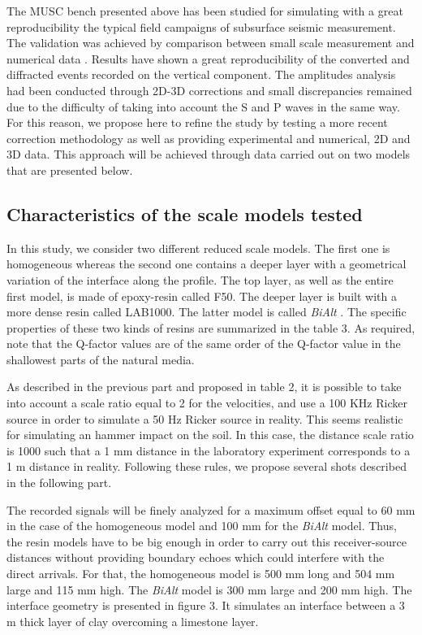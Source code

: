 \documentclass[manuscript,revised]{geophysics}
\newcommand{\bialt}{\textit{BiAlt} }
\begin{document}
\noindent The MUSC bench presented above has been studied for simulating with a great reproducibility the typical field campaigns of subsurface seismic measurement. The validation was achieved by comparison between small scale measurement and numerical data \citep{Bretaudeau_SSM_2011}. Results have shown a great reproducibility of the converted and diffracted events recorded on the vertical component. The amplitudes analysis had been conducted through 2D-3D corrections and small discrepancies remained due to the difficulty of taking into account the S and P waves in the same way. For this reason, we propose here to refine the study by testing a more recent correction methodology \citet{Schafer_LSS_2014} as well as providing experimental and numerical, 2D and 3D data. This approach will be achieved through data carried out on two models that are presented below.


\subsection{Characteristics of the scale models tested}

\noindent In this study, we consider two different reduced scale models. The first one is homogeneous whereas the second one contains a deeper layer with a geometrical variation of the interface along the profile. The top layer, as well as the entire first model, is made of epoxy-resin called F50. The deeper layer is built with a more dense resin called LAB1000. The latter model is called \bialt. The specific properties of these two kinds of resins are summarized in the table 3. As required, note that the Q-factor values are of the same order of the Q-factor value in the shallowest parts of the natural media.

\noindent As described in the previous part and proposed in table 2, it is possible to take into account a scale ratio equal to 2 for the velocities, and use a 100 KHz Ricker source in order to simulate a 50 Hz Ricker source in reality. This seems realistic for simulating an hammer impact on the soil. In this case, the distance scale ratio is 1000 such that a 1 mm distance in the laboratory experiment corresponds to a 1 m distance in reality. Following these rules, we propose several shots described in the following part. 

\noindent The recorded signals will be finely analyzed for a maximum offset equal to 60 mm in the case of the homogeneous model and 100 mm for the \bialt model. Thus, the resin models have to be big enough in order to carry out this receiver-source distances without providing boundary echoes which could interfere with the direct arrivals. For that, the homogeneous model is 500 mm long and 504 mm large and 115 mm high. The \bialt model is 300 mm large and 200 mm high. The interface geometry is presented in figure 3. It simulates an interface between a 3 m thick layer of clay overcoming a limestone layer.
\end{document}
